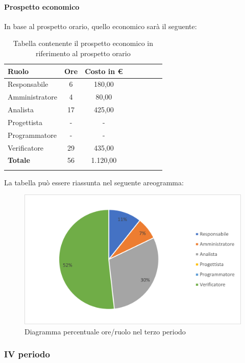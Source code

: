 			\paragraph{Prospetto economico}
			In base al prospetto orario, quello economico sarà il seguente: 
			
			\begin{longtable}{|l|c|c|c|c|c|c|c|}
				\hline
				\rowcolor{lighter-grayer}
				\textbf{Ruolo} & \textbf{Ore} & \textbf{Costo in €} \\
				\hline
				\endfirsthead
				
				\hline
				Responsabile & 6 & 180,00\\
				\hline
				\hline
				Amministratore & 4 & 80,00\\
				\hline
				\hline
				Analista & 17 & 425,00\\
				\hline
				\hline
				Progettista & - & -\\
				\hline
				\hline
				Programmatore & - & -\\
				\hline
				\hline
				Verificatore & 29 & 435,00\\
				\hline
				\textbf{Totale} & 56 & 1.120,00\\
				\hline
				\rowcolor{white}
				\caption{Tabella contenente il prospetto economico in riferimento al prospetto orario}
			\end{longtable}
			\pagebreak
		
			La tabella può essere riassunta nel seguente areogramma:
			\begin{figure}[H]
				\centering
				\includegraphics[width=0.8\linewidth]{res/images/preventivo/dettaglio_analisi/3-2.png}
				\caption{Diagramma percentuale ore/ruolo nel terzo periodo}
				\label{fig:diagramma costi ruolo terzo periodo analisi}
            \end{figure}

	\subsubsection{IV periodo}
